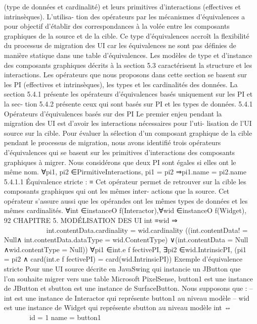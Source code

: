 \documentclass{article}
\begin{document}
(type de données et cardinalité) et leurs primitives d’interactions (effectives et intrinsèques). L’utilisa-
tion des opérateurs par les mécanismes d’équivalences a pour objectif d’établir des correspondances
à la volée entre les composants graphiques de la source et de la cible. Ce type d’équivalences accroît
la ﬂexibilité du processus de migration des UI car les équivalences ne sont pas déﬁnies de manière
statique dans une table d’équivalences.
Les modèles de type et d’instance des composants graphiques décrits à la section 5.3 caractérisent
la structure et les interactions. Les opérateurs que nous proposons dans cette section se basent sur les
PI (effectives et intrinsèques), les types et les cardinalités des données.
La section 5.4.1 présente les opérateurs d’équivalences basés uniquement sur les PI et la sec-
tion 5.4.2 présente ceux qui sont basés sur PI et les types de données.
5.4.1
Opérateurs d’équivalences basés sur des PI
Le premier enjeu pendant la migration des UI est d’avoir les interactions nécessaires pour l’uti-
lisation de l’UI source sur la cible. Pour évaluer la sélection d’un composant graphique de la cible
pendant le processus de migration, nous avons identiﬁé trois opérateurs d’équivalences qui se basent
sur les primitives d’interactions des composants graphiques à migrer.
Nous considérons que deux PI sont égales si elles ont le même nom.
∀pi1, pi2 ∈{PirmitiveInteractions},
pi1 = pi2 ⇒pi1.name = pi2.name
5.4.1.1
Équivalence stricte : ≡
Cet opérateur permet de retrouver sur la cible les composants graphiques qui ont les mêmes inter-
actions que la source. Cet opérateur s’assure aussi que les opérandes ont les mêmes types de données
et les mêmes cardinalités.
∀int ∈instanceO f(Interactor),∀wid ∈instanceO f(Widget),
92
CHAPITRE 5. MODÉLISATION DES UI
int ≡wid ⇒



























int.contentData.cardinality = wid.cardinality
((int.contentData! = Null∧
int.contentData.dataType = wid.ContentType)
∨(int.contentData = Null ∧wid.contentType = Null))
∀pi1 ∈int.e f fectivePI,
∃pi2 ∈wid.IntrinsicPI,
(pi1 = pi2
∧
card(int.e f fectivePI) = card(wid.IntrinsicPI))
Exemple d’équivalence stricte
Pour une UI source décrite en JavaSwing qui instancie un JButton
que l’on souhaite migrer vers une table Microsoft PixelSense, button1 est une instance de JButton et
sbutton est une instance de SurfaceButton. Nous supposons que :
– int est une instance de Interactor qui représente button1 au niveau modèle
– wid est une instance de Widget qui représente sbutton au niveau modèle
int ⇔











id = 1
name = button1
\end{document}
